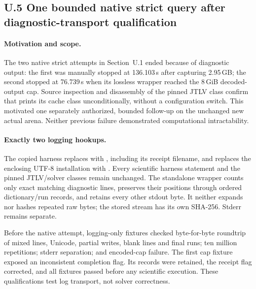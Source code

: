 \subsection*{U.5 One bounded native strict query after diagnostic-transport qualification}
\label{supp:native-strict-diagnostic}

\paragraph{Motivation and scope.}
The two native strict attempts in Section~U.1 ended because of diagnostic
output: the first was manually stopped at 136.103\,s after capturing
2.95\,GB; the second stopped at 76.739\,s when its lossless wrapper reached
the 8\,GiB decoded-output cap. Source inspection and disassembly of the
pinned JTLV class confirm that  prints its cache
class unconditionally, without a configuration switch. This motivated
one separately authorized, bounded follow-up on the unchanged new actual
arena. Neither previous failure demonstrated computational intractability.

\paragraph{Exactly two logging hookups.}
The copied harness replaces  with
, including its receipt filename, and
replaces the enclosing UTF-8  installation with
. Every scientific harness statement and the
pinned JTLV/solver classes remain unchanged. The standalone wrapper counts
only exact matching diagnostic lines, preserves their positions through
ordered dictionary/run records, and retains every other stdout byte.
It neither expands nor hashes repeated raw bytes; the stored stream has
its own SHA-256. Stderr remains separate.

Before the native attempt, logging-only fixtures checked byte-for-byte
roundtrip of mixed lines, Unicode, partial writes, blank lines and final
runs; ten million repetitions; stderr separation; and encoded-cap failure.
The first cap fixture exposed an inconsistent completion flag. Its
records were retained, the receipt flag corrected, and all fixtures
passed before any scientific execution. These qualifications test log
transport, not solver correctness.

